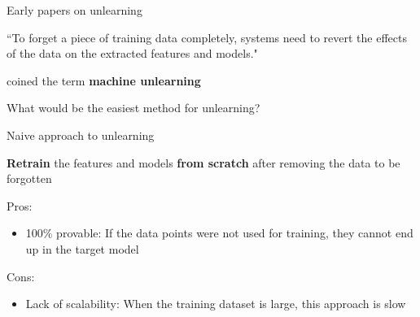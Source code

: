 \documentclass[12pt,aspectratio=169,handout]{beamer}
\begin{document}
\begin{frame}{Early papers on unlearning}

``To forget a piece of training data completely, systems need to revert the effects of the data on the extracted features and models."

\citet{Cao.Yang.2015.SP} coined the term \textbf{machine unlearning}

\bigskip

What would be the easiest method for unlearning?



\end{frame}


\begin{frame}{Naive approach to unlearning}

\textbf{Retrain} the features and models \textbf{from scratch} after removing the data to be forgotten

Pros:
\begin{itemize}
\item 100\% provable: If the data points were not used for training, they cannot end up in the target model
\end{itemize}

Cons:
\begin{itemize}
\item Lack of scalability: When the training dataset is large, this approach is slow
\end{itemize}



\end{frame}
\end{document}
